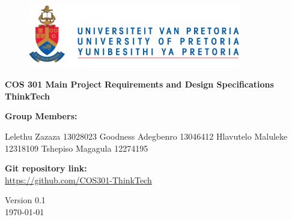 \begin{titlepage}
	\begin{center}
		
		\begin{figure}[t]
			\centering
			\includegraphics[width=350px]{UP_Logo.png}
		\end{figure}		
	
	
	\begin{flushright} 
		
		\textbf{\LARGE COS 301 Main Project}
		\newline \newline \newline
		\textbf{\LARGE Requirements and Design Specifications}
		\newline \newline \newline
 		\textbf{\LARGE ThinkTech}
		\newline \newline \newline
	\end{flushright}
		
		\vspace{1 cm}
		
		\LARGE{\textbf{Group Members: }}
		

		\begin{flushright} \large
			Lelethu Zazaza 13028023\newline
			Goodness Adegbenro 13046412\newline
			Hlavutelo Maluleke 12318109\newline
			Tshepiso Magagula 12274195\newline
		\end{flushright}
		
	
		
		\textbf{Git repository link:\\}
		 \url{ https://github.com/COS301-ThinkTech}
		
		\vfill
		
		{\LARGE Version 0.1}
		\\
		{\large \today}		
		
		
	\end{center}
\end{titlepage}
